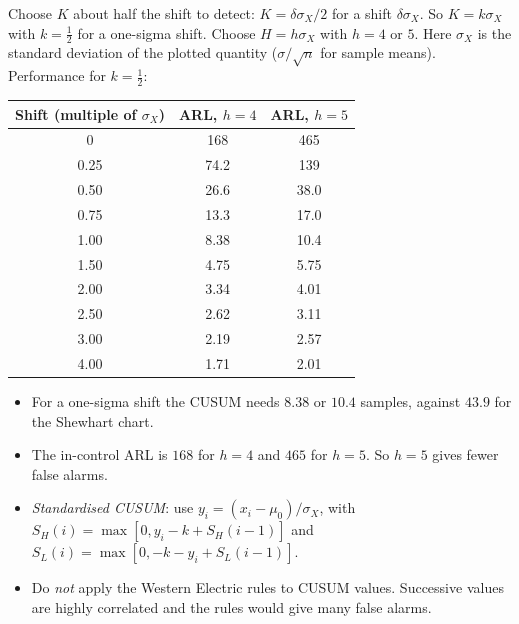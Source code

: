 \begin{theorem}\label{thm:cusumdesign}
Choose $K$ about half the shift to detect: $K=\delta\sigma_X/2$ for a shift $\delta\sigma_X$. So $K=k\sigma_X$ with $k=\tfrac12$ for a one-sigma shift. Choose $H=h\sigma_X$ with $h=4$ or $5$. Here $\sigma_X$ is the standard deviation of the plotted quantity ($\sigma/\sqrt n$ for sample means). Performance for $k=\tfrac12$:
\begin{center}
\begin{tabular}{c|cc}
\toprule
Shift (multiple of $\sigma_X$) & ARL, $h=4$ & ARL, $h=5$\\
\midrule
0 & 168 & 465\\
0.25 & 74.2 & 139\\
0.50 & 26.6 & 38.0\\
0.75 & 13.3 & 17.0\\
1.00 & 8.38 & 10.4\\
1.50 & 4.75 & 5.75\\
2.00 & 3.34 & 4.01\\
2.50 & 2.62 & 3.11\\
3.00 & 2.19 & 2.57\\
4.00 & 1.71 & 2.01\\
\bottomrule
\end{tabular}
\end{center}
\end{theorem}

\begin{itemize}
  \item For a one-sigma shift the CUSUM needs $8.38$ or $10.4$ samples, against $43.9$ for the Shewhart chart.
  \item The in-control ARL is $168$ for $h=4$ and $465$ for $h=5$. So $h=5$ gives fewer false alarms.
  \item \emph{Standardised CUSUM}: use $y_i=(x_i-\mu_0)/\sigma_X$, with $S_H(i)=\max[0,y_i-k+S_H(i-1)]$ and $S_L(i)=\max[0,-k-y_i+S_L(i-1)]$.
  \item Do \emph{not} apply the Western Electric rules to CUSUM values. Successive values are highly correlated and the rules would give many false alarms.
\end{itemize}


